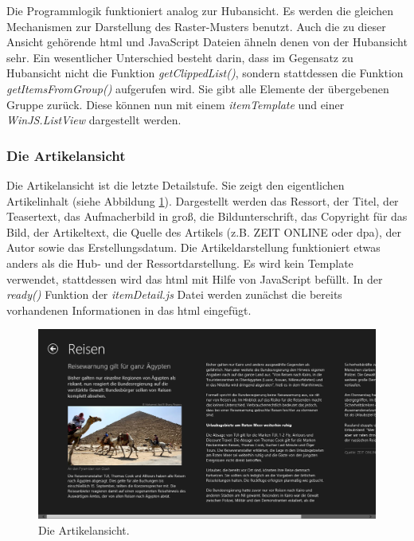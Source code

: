 \documentclass[12pt,a4paper,bibtotoc,abstracton]{scrartcl}
\begin{document}
Die Programmlogik funktioniert analog zur Hubansicht. Es werden die gleichen Mechanismen zur Darstellung des Raster-Musters benutzt. Auch die zu dieser Ansicht gehörende \ac{html} und JavaScript Dateien ähneln denen von der Hubansicht sehr. Ein wesentlicher Unterschied besteht darin, dass im Gegensatz zu Hubansicht nicht die Funktion \textit{getClippedList()}, sondern stattdessen die Funktion \textit{getItemsFromGroup()} aufgerufen wird. Sie gibt alle Elemente der übergebenen Gruppe zurück. Diese können nun mit einem \textit{itemTemplate} und einer \textit{WinJS.ListView} dargestellt werden. 

\subsubsection{Die Artikelansicht}
\label{subsubsec:artikelansicht}
Die Artikelansicht ist die letzte Detailstufe. Sie zeigt den eigentlichen Artikelinhalt (siehe Abbildung \ref{fig:artikelansicht}). Dargestellt werden das Ressort, der Titel, der Teasertext, das Aufmacherbild in groß, die Bildunterschrift, das Copyright für das Bild, der Artikeltext, die Quelle des Artikels (z.B. ZEIT ONLINE oder dpa), der Autor sowie das Erstellungsdatum. Die Artikeldarstellung funktioniert etwas anders als die Hub- und der Ressortdarstellung. Es wird kein Template verwendet, stattdessen wird das \ac{html} mit Hilfe von JavaScript befüllt. In der \textit{ready()} Funktion der \textit{itemDetail.js} Datei werden zunächst die bereits vorhandenen Informationen in das \ac{html} eingefügt.

\begin{figure}[h]
	\centering
	\includegraphics[width=\textwidth]{Bilder/Screenshots/app/reise_aegypten_4d.png} 
	\caption{Die Artikelansicht.}
	\label{fig:artikelansicht}
\end{figure}
\end{document}
